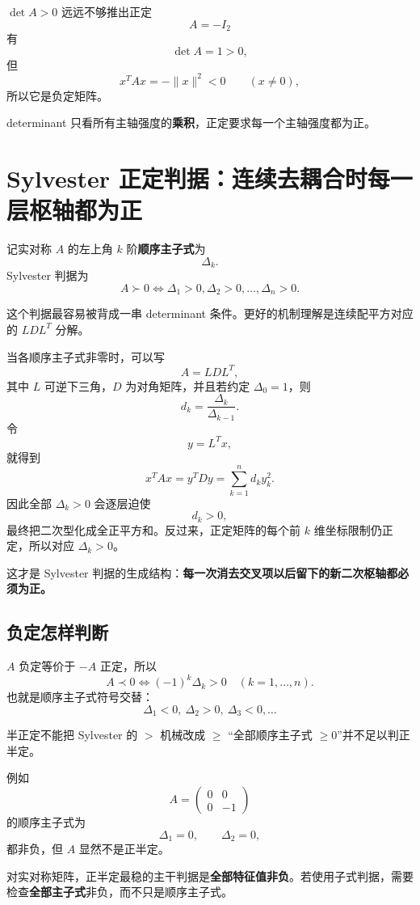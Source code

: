 \documentclass[11pt,a4paper]{ctexart}
\newcommand{\kw}[1]{\textbf{\color{deep}#1}}
\begin{document}
\begin{warnbox}{$\det A>0$ 远远不够推出正定}
\[
A=-I_2
\]
有
\[
\det A=1>0,
\]
但
\[
x^TAx=-\|x\|^2<0\qquad(x\neq0),
\]
所以它是负定矩阵。

determinant 只看所有主轴强度的\kw{乘积}，正定要求每一个主轴强度都为正。
\end{warnbox}

\section{Sylvester 正定判据：连续去耦合时每一层枢轴都为正}

记实对称 $A$ 的左上角 $k$ 阶\kw{顺序主子式}为
\[
\Delta_k.
\]
Sylvester 判据为
\[
\boxed{
A\succ0
\iff
\Delta_1>0,\Delta_2>0,\dots,\Delta_n>0.
}
\]

这个判据最容易被背成一串 determinant 条件。更好的机制理解是连续配平方对应的 $LDL^T$ 分解。

当各顺序主子式非零时，可以写
\[
A=LDL^T,
\]
其中 $L$ 可逆下三角，$D$ 为对角矩阵，并且若约定 $\Delta_0=1$，则
\[
\boxed{d_k=\frac{\Delta_k}{\Delta_{k-1}}.}
\]
令
\[
y=L^Tx,
\]
就得到
\[
x^TAx=y^TDy=\sum_{k=1}^{n}d_ky_k^2.
\]
因此全部 $\Delta_k>0$ 会逐层迫使
\[
d_k>0,
\]
最终把二次型化成全正平方和。反过来，正定矩阵的每个前 $k$ 维坐标限制仍正定，所以对应 $\Delta_k>0$。

这才是 Sylvester 判据的生成结构：\kw{每一次消去交叉项以后留下的新二次枢轴都必须为正。}

\subsection{负定怎样判断}

$A$ 负定等价于 $-A$ 正定，所以
\[
\boxed{A\prec0\iff (-1)^k\Delta_k>0\quad(k=1,\dots,n).}
\]
也就是顺序主子式符号交替：
\[
\Delta_1<0,\ \Delta_2>0,\ \Delta_3<0,\dots
\]

\begin{warnbox}{半正定不能把 Sylvester 的 $>$ 机械改成 $\ge$}
“全部顺序主子式 $\ge0$”并不足以判正半定。

例如
\[
A=\begin{pmatrix}0&0\\0&-1\end{pmatrix}
\]
的顺序主子式为
\[
\Delta_1=0,\qquad\Delta_2=0,
\]
都非负，但 $A$ 显然不是正半定。

对实对称矩阵，正半定最稳的主干判据是\kw{全部特征值非负}。若使用子式判据，需要检查\kw{全部主子式}非负，而不只是顺序主子式。
\end{warnbox}
\end{document}
